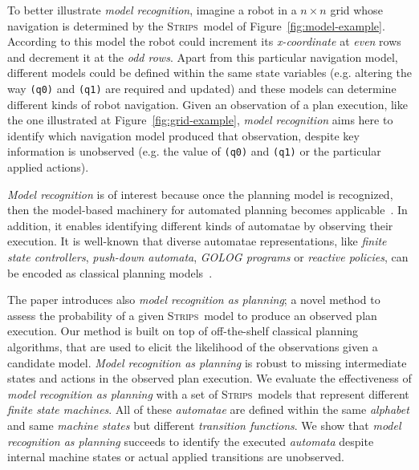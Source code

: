 \documentclass[letterpaper]{article} %
\newcommand{\strips}{\textsc{Strips}}     %
\begin{document}
To better illustrate {\em model recognition}, imagine a robot in a $n\times n$ grid whose navigation is determined by the \strips\ model of Figure~\ref{fig:model-example}. According to this model the robot could increment its {\em x-coordinate} at {\em even} rows and decrement it at the {\em odd rows}. Apart from this particular navigation model, different models could be defined within the same state variables (e.g. altering the way {\small\tt (q0)} and {\small\tt (q1)} are required and updated) and these models can determine different kinds of robot navigation. Given an observation of a plan execution, like the one illustrated at Figure~\ref{fig:grid-example}, {\em model recognition} aims here to identify which navigation model produced that observation, despite key information is unobserved (e.g. the value of {\small\tt (q0)} and {\small\tt (q1)} or the particular applied actions). 

{\em Model recognition} is of interest because once the planning model is recognized, then the model-based machinery for automated planning becomes applicable~\cite{ghallab2004automated}. In addition, it enables identifying different kinds of automatae by observing their execution. It is well-known that diverse automatae representations, like {\em finite state controllers}, {\em push-down automata}, {\em {\sc GOLOG} programs} or {\em reactive policies}, can be encoded as classical planning models~\cite{baier2007exploiting,Geffner:FSM:AAAI10,ivankovic2015optimal,segovia2017generating}.

The paper introduces also {\em model recognition as planning}; a novel method to assess the probability of a given \strips\ model to produce an observed plan execution. Our method is built on top of off-the-shelf classical planning algorithms, that are used to elicit the likelihood of the observations given a candidate model. {\em Model recognition as planning} is robust to missing intermediate states and actions in the observed plan execution. We evaluate the effectiveness of {\em model recognition as planning} with a set of \strips\ models that represent different {\em finite state machines}. All of these {\em automatae} are defined within the same {\em alphabet} and same {\em machine states} but different {\em transition functions}. We show that {\em model recognition as planning} succeeds to identify the executed {\em automata} despite internal machine states or actual applied transitions are unobserved.
\end{document}
